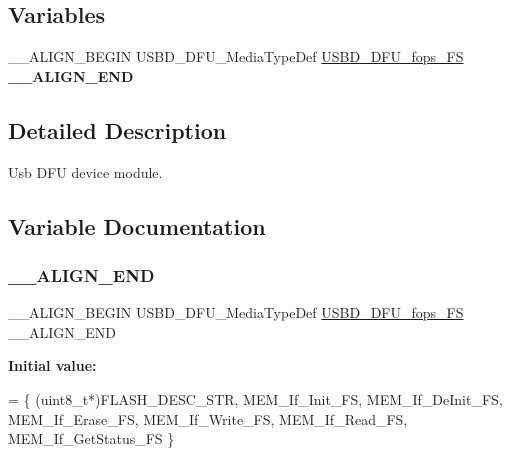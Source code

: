 \subsection*{Variables}
\begin{DoxyCompactItemize}
\item 
\+\_\+\+\_\+\+A\+L\+I\+G\+N\+\_\+\+B\+E\+G\+IN U\+S\+B\+D\+\_\+\+D\+F\+U\+\_\+\+Media\+Type\+Def \hyperlink{group__USBD__MEDIA__Exported__Variables_ga80d5adc305621ee5ee069f112ebfdd8f}{U\+S\+B\+D\+\_\+\+D\+F\+U\+\_\+fops\+\_\+\+FS} {\bfseries \+\_\+\+\_\+\+A\+L\+I\+G\+N\+\_\+\+E\+ND}
\end{DoxyCompactItemize}


\subsection{Detailed Description}
Usb D\+FU device module. 



\subsection{Variable Documentation}
\mbox{\label{group__USBD__DFU_ga8f683037a1d883111e2cb0722c47991b}} 
\subsubsection{\texorpdfstring{\+\_\+\+\_\+\+A\+L\+I\+G\+N\+\_\+\+E\+ND}{\_\_ALIGN\_END}}
{\footnotesize\ttfamily \+\_\+\+\_\+\+A\+L\+I\+G\+N\+\_\+\+B\+E\+G\+IN U\+S\+B\+D\+\_\+\+D\+F\+U\+\_\+\+Media\+Type\+Def \hyperlink{group__USBD__MEDIA__Exported__Variables_ga80d5adc305621ee5ee069f112ebfdd8f}{U\+S\+B\+D\+\_\+\+D\+F\+U\+\_\+fops\+\_\+\+FS} \+\_\+\+\_\+\+A\+L\+I\+G\+N\+\_\+\+E\+ND}

{\bfseries Initial value\+:}
\begin{DoxyCode}
=
\{
   (uint8\_t*)FLASH\_DESC\_STR,
    MEM\_If\_Init\_FS,
    MEM\_If\_DeInit\_FS,
    MEM\_If\_Erase\_FS,
    MEM\_If\_Write\_FS,
    MEM\_If\_Read\_FS,
    MEM\_If\_GetStatus\_FS
\}
\end{DoxyCode}
